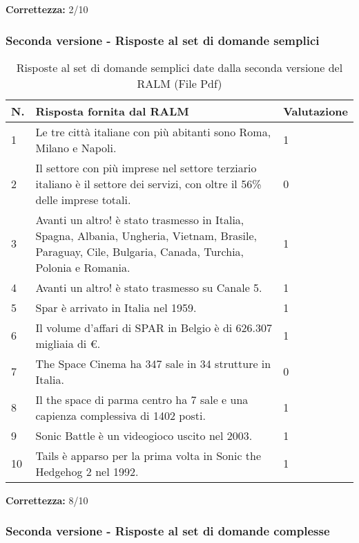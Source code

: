 \textbf{Correttezza:} 2/10

\subsubsection{Seconda versione - Risposte al set di domande semplici}

\begin{table}[H]
    \centering
    \begin{tabular}{|p{0.5cm} |p{6cm} |p{2cm}|}
        \hline
        \textbf{N}. & \textbf{Risposta fornita dal RALM} & \textbf{Valutazione} \\
        \hline
        1 & Le tre città italiane con più abitanti sono Roma, Milano e Napoli. & 1 \\
        \hline
        2 & Il settore con più imprese nel settore terziario italiano è il settore dei servizi, con oltre il 56\% delle imprese totali. & 0 \\
        \hline
        3 & Avanti un altro! è stato trasmesso in Italia, Spagna, Albania, Ungheria, Vietnam, Brasile, Paraguay, Cile, Bulgaria, Canada, Turchia, Polonia e Romania. & 1 \\
        \hline
        4 & Avanti un altro! è stato trasmesso su Canale 5. & 1 \\
        \hline
        5 & Spar è arrivato in Italia nel 1959. & 1 \\
        \hline
        6 & Il volume d'affari di SPAR in Belgio è di 626.307 migliaia di €. & 1 \\
        \hline
        7 & The Space Cinema ha 347 sale in 34 strutture in Italia. & 0 \\
        \hline
        8 & Il the space di parma centro ha 7 sale e una capienza complessiva di 1402 posti. & 1 \\
        \hline
        9 & Sonic Battle è un videogioco uscito nel 2003. & 1 \\
        \hline
        10 & Tails è apparso per la prima volta in Sonic the Hedgehog 2 nel 1992. & 1 \\
        \hline
    \end{tabular}
    \caption{Risposte al set di domande semplici date dalla seconda versione del RALM (File Pdf)}
\end{table}

\textbf{Correttezza:} 8/10

\subsubsection{Seconda versione - Risposte al set di domande complesse}

